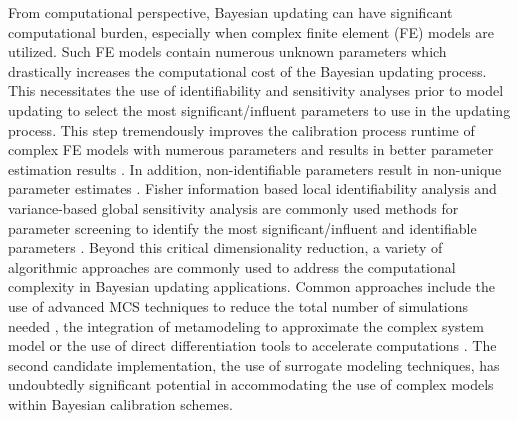 From computational perspective, Bayesian updating can have significant computational burden, especially when complex finite element (FE) models are utilized. Such FE models contain numerous unknown parameters which drastically increases the computational cost of the Bayesian updating process. This necessitates the use of identifiability and sensitivity analyses prior to model updating to select the most significant/influent parameters to use in the updating process. This step tremendously improves the calibration process runtime of complex FE models with numerous parameters and results in better parameter estimation results \citep{ramancha2021bayesianupdating}. In addition, non-identifiable parameters result in non-unique parameter estimates \citep{ramancha2020nonunique}. Fisher information based local identifiability analysis and variance-based global sensitivity analysis are commonly used methods for parameter screening to identify the most significant/influent and identifiable parameters \citep{ramancha2021bayesianupdating}. Beyond this critical dimensionality reduction, a variety of algorithmic approaches are commonly used to address the computational complexity in Bayesian updating applications. Common approaches include the use of advanced MCS techniques to reduce the total number of simulations needed \citep{quiroz2018speeding}, the integration of metamodeling to approximate the complex system model \citep{angelikopoulos2015xtmcmc, giovanis2017bayesian, wang2019reliabilitybased, zhang2019accelerating} or the use of direct differentiation tools to accelerate computations \citep{astroza2017batch}. The second candidate implementation, the use of surrogate modeling techniques, has undoubtedly significant potential in accommodating the use of complex models within Bayesian calibration schemes.     

